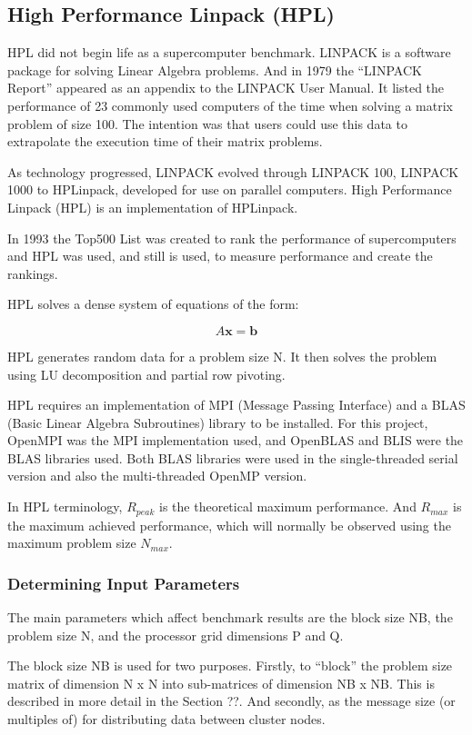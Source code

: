 %
%
\subsection{High Performance Linpack (HPL)}

HPL did not begin life as a supercomputer benchmark. LINPACK is a software package for solving Linear Algebra problems. And in 1979 the ``LINPACK Report'' appeared as an appendix to the LINPACK User Manual. It listed the performance of 23 commonly used computers of the time when solving a matrix problem of size 100. The intention was that users could use this data to extrapolate the execution time of their matrix problems.

As technology progressed, LINPACK evolved through LINPACK 100, LINPACK 1000 to HPLinpack, developed for use on parallel computers. High Performance Linpack (HPL) is an implementation of HPLinpack.

In 1993 the Top500 List was created to rank the performance of supercomputers and HPL was used, and still is used, to measure performance and create the rankings.

HPL solves a dense system of equations of the form:

\[A\mathbf{x}=\mathbf{b}\]

HPL generates random data for a problem size N. It then solves the problem using LU decomposition and partial row pivoting.

HPL requires an implementation of MPI (Message Passing Interface) and a BLAS (Basic Linear Algebra Subroutines) library to be installed. For this project, OpenMPI was the MPI implementation used, and OpenBLAS and BLIS were the BLAS libraries used. Both BLAS libraries were used in the single-threaded serial version and also the multi-threaded OpenMP version.

In HPL terminology, $R_{peak}$ is the theoretical maximum performance. And $R_{max}$ is the maximum achieved performance, which will normally be observed using the maximum problem size $N_{max}$.


%
%
\subsubsection{Determining Input Parameters}

The main parameters which affect benchmark results are the block size NB, the problem size N, and the processor grid dimensions P and Q.

The block size NB is used for two purposes. Firstly, to ``block'' the problem size matrix of dimension N x N into sub-matrices of dimension NB x NB. This is described in more detail in the Section ??. And secondly, as the message size (or multiples of) for distributing data between cluster nodes.

